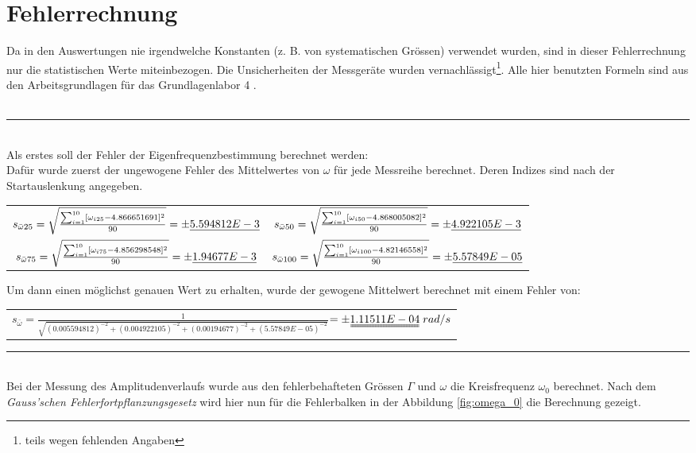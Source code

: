 \chapter{Fehlerrechnung}
\thispagestyle{fancy}
Da in den Auswertungen nie irgendwelche Konstanten (z. B. von systematischen Grössen) verwendet wurden, sind in dieser Fehlerrechnung nur die statistischen Werte miteinbezogen. Die Unsicherheiten der Messgeräte wurden vernachlässigt\footnote{teils wegen fehlenden Angaben}. Alle hier benutzten Formeln sind aus den Arbeitsgrundlagen für das Grundlagenlabor 4 \cite{TechnikFHNW2016}. \\
\\[0.25cm]
\noindent\rule{\textwidth}{0.4pt}
\\[0.4cm]
Als erstes soll der Fehler der Eigenfrequenzbestimmung berechnet werden:\\
Dafür wurde zuerst der ungewogene Fehler des Mittelwertes von $\omega$ für jede Messreihe berechnet. Deren Indizes sind nach der Startauslenkung angegeben.
\begin{table}[H]
\centering
\begin{tabular}{cc}
$s_{\bar{\omega}25}=\sqrt{\frac{\sum\nolimits_{i=1}^{10}[\omega_{i25}-4.866651691
]^{2}}{90}}=\pm\uline{5.594812E-3}
$ & $s_{\bar{\omega}50}=\sqrt{\frac{\sum\nolimits_{i=1}^{10}[\omega_{i50}-4.868005082
]^{2}}{90}}=\pm\uline{4.922105E-3}
$ \\ 
$s_{\bar{\omega}75}=\sqrt{\frac{\sum\nolimits_{i=1}^{10}[\omega_{i75}-4.856298548
]^{2}}{90}}=\pm\uline{1.94677E-3}
$ & $s_{\bar{\omega}100}=\sqrt{\frac{\sum\nolimits_{i=1}^{10}[\omega_{i100}-4.82146558
]^{2}}{90}}=\pm\uline{5.57849E-05}
$ \\ 
\end{tabular} 
\end{table}
Um dann einen möglichst genauen Wert zu erhalten, wurde der gewogene Mittelwert berechnet mit einem Fehler von:
\begin{table}[H]
\centering
\begin{tabular}{c}
{\Large $s_{\bar{\omega}}=\frac{1}{\sqrt{(0.005594812)^{-2}+(0.004922105)^{-2}+(0.00194677)^{-2}+(5.57849E-05)^{-2}}}$}$=\pm\uuline{1.11511E-04}\;rad/s$
\end{tabular} 
\end{table}
\noindent\rule{\textwidth}{0.4pt}
\\[0.4cm]
Bei der Messung des Amplitudenverlaufs wurde aus den fehlerbehafteten Grössen $\Gamma$ und $\omega$ die Kreisfrequenz $\omega_{0}$ berechnet. Nach dem \textit{Gauss'schen Fehlerfortpflanzungsgesetz} wird hier nun für die Fehlerbalken in der Abbildung \ref{fig:omega_0} die Berechnung gezeigt.\\
